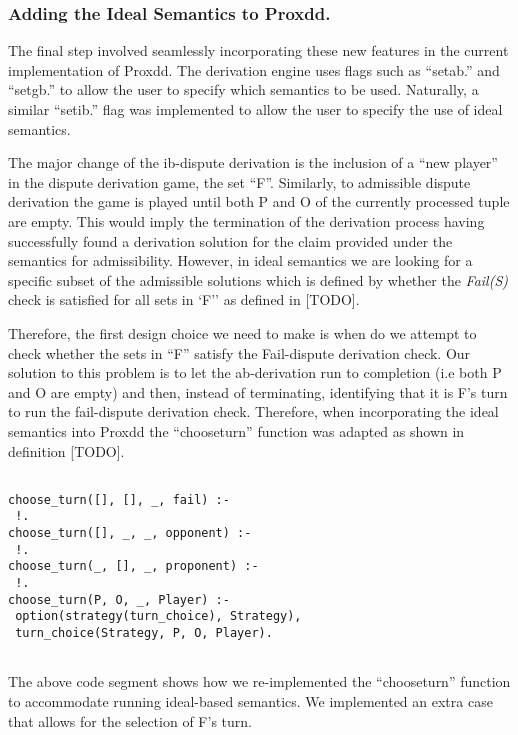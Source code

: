 \subsubsection{Adding the Ideal Semantics to Proxdd.}

The final step involved seamlessly incorporating these new features in the current implementation of Proxdd. The derivation engine uses flags such as ``set\textunderscore ab.'' and ``set\textunderscore gb.'' to allow the user to specify which semantics to be used. Naturally, a similar ``set\textunderscore ib.'' flag was implemented to allow the user to specify the use of ideal semantics.

The major change of the ib-dispute derivation is the inclusion of a ``new player'' in the dispute derivation game, the set ``F''. Similarly, to admissible dispute derivation the game is played until both P and O of the currently processed tuple are empty. This would imply the termination of the derivation process having successfully found a derivation solution for the claim provided under the semantics for admissibility. However, in ideal semantics we are looking for a specific subset of the admissible solutions which is defined by whether the \emph{Fail(S)} check is satisfied for all sets in `F'' as defined in [TODO].

Therefore, the first design choice we need to make is when do we attempt to check whether the sets in ``F'' satisfy the Fail-dispute derivation check. Our solution to this problem is to let the ab-derivation run to completion (i.e both P and O are empty) and then, instead of terminating, identifying that it is F's turn to run the fail-dispute derivation check. Therefore, when incorporating the ideal semantics into Proxdd the ``choose\textunderscore turn'' function was adapted as shown in definition [TODO].

\begin{Verbatim}[frame=single]

choose_turn([], [], _, fail) :-
 !.
choose_turn([], _, _, opponent) :-
 !.
choose_turn(_, [], _, proponent) :-
 !.
choose_turn(P, O, _, Player) :-
 option(strategy(turn_choice), Strategy),
 turn_choice(Strategy, P, O, Player).
 
\end{Verbatim}

The above code segment shows how we re-implemented the ``choose\textunderscore turn'' function to accommodate running ideal-based semantics. We implemented an extra case that allows for the selection of F's turn.

